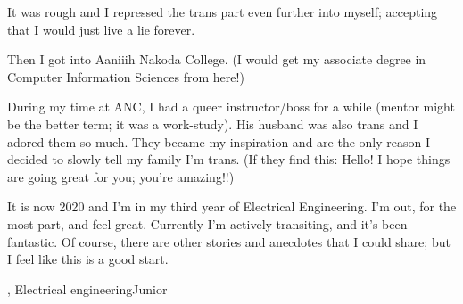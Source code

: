{It was rough and I repressed the trans part even further into myself; accepting 
that I would just live a lie forever. 


Then I got into Aaniiih Nakoda College. (I would get my associate degree in 
Computer Information Sciences from here!)


During my time at ANC, I had a queer instructor/boss for a while (mentor might 
be the better term; it was a work-study). His husband was also trans and I 
adored them so much. They became my inspiration and are the only reason I 
decided to slowly tell my family I’m trans. (If they find this: Hello! I hope 
things are going great for you; you’re amazing!!)


It is now 2020 and I’m in my third year of Electrical Engineering. I’m out, for 
the most part, and feel great. Currently I’m actively transiting, and it’s been 
fantastic. Of course, there are other stories and anecdotes that I could share; 
but I feel like this is a good start.
}
{\he, \they}{Electrical engineering}{Junior}
{\asexualflagstory \pansexualflagstory \transgenderflagstory}
